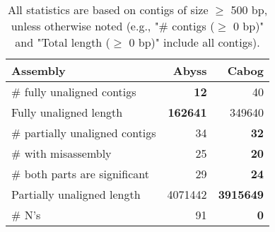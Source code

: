 \documentclass[12pt,a4paper]{article}
\begin{document}
\begin{table}[ht]
\begin{center}
\caption{All statistics are based on contigs of size $\geq$ 500 bp, unless otherwise noted (e.g., "\# contigs ($\geq$ 0 bp)" and "Total length ($\geq$ 0 bp)" include all contigs).}
\begin{tabular}{|l*{2}{|r}|}
\hline
Assembly & Abyss & Cabog \\ \hline
\# fully unaligned contigs & {\bf 12} & 40 \\ \hline
Fully unaligned length & {\bf 162641} & 349640 \\ \hline
\# partially unaligned contigs & 34 & {\bf 32} \\ \hline
\hspace{5mm}\# with misassembly & 25 & {\bf 20} \\ \hline
\hspace{5mm}\# both parts are significant & 29 & {\bf 24} \\ \hline
Partially unaligned length & 4071442 & {\bf 3915649} \\ \hline
\# N's & 91 & {\bf 0} \\ \hline
\end{tabular}
\end{center}
\end{table}
\end{document}
